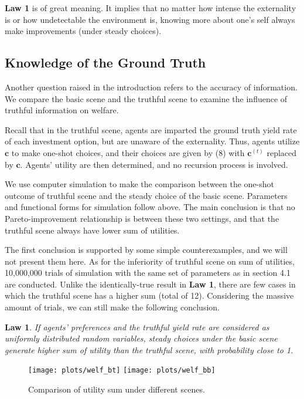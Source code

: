 \documentclass[12pt,english]{article}
\theoremstyle{plain}
\theoremstyle{plain}
\newtheorem{law}{Law}
\begin{document}
	\textbf{Law 1} is of great meaning. It implies that no matter how intense the externality is or how undetectable the environment is, knowing more about one's self always make improvements (under steady choices).
	
	
	\subsection{Knowledge of the Ground Truth}
	
	Another question raised in the introduction refers to the accuracy of information. We compare the basic scene and the truthful scene to examine the influence of truthful information on welfare.\par 
	
	Recall that in the truthful scene, agents are imparted the ground truth yield rate of each investment option, but are unaware of the externality. Thus, agents utilize $\mathbf{c}$ to make one-shot choices, and their choices are given by (8) with $\mathbf{c}^{(t)}$ replaced by $\mathbf{c}$. Agents' utility are then determined, and no recursion process is involved.\par 
	
	We use computer simulation to make the comparison between the one-shot outcome of truthful scene and the steady choice of the basic scene. Parameters and functional forms for simulation follow above. The main conclusion is that no Pareto-improvement relationship is between these two settings, and that the truthful scene always have lower sum of utilities.\par
	
	The first conclusion is supported by some simple counterexamples, and we will not present them here. As for the inferiority of truthful scene on sum of utilities, 10,000,000 trials of simulation with the same set of parameters as in section 4.1 are conducted. Unlike the identically-true result in \textbf{Law 1}, there are few cases in which the truthful scene has a higher sum (total of 12). Considering the massive amount of trials, we can still make the following conclusion.
	\begin{law}
		If agents' preferences and the truthful yield rate are considered as uniformly distributed random variables, steady choices under the basic scene generate higher sum of utility than the truthful scene, with probability close to 1. 
	\end{law}
	
	\begin{figure}[h]
		\centering
		\subfigure
		{
			\texttt{[image: plots/welf\_bt]}
		}\quad
		\subfigure
		{
			\texttt{[image: plots/welf\_bb]}
		}
		
		\caption{Comparison of utility sum under different scenes.}
		\label{fig:welf_vs}
	\end{figure}
	 
\end{document}
